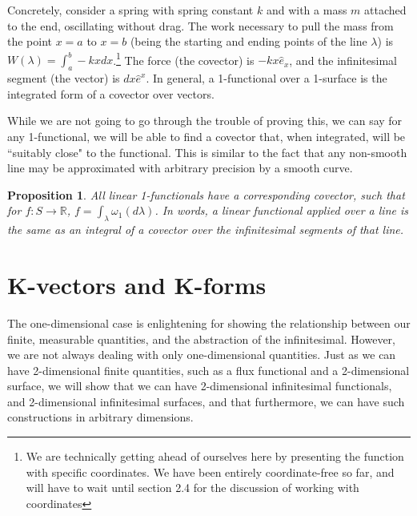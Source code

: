 \documentclass{book}
\newtheorem{prop}[equation]{Proposition}
\begin{document}
Concretely, consider a spring with spring constant $k$ and with a mass $m$ attached to the end, oscillating without drag. The work necessary to pull the mass from the point $x = a$ to $x = b$ (being the starting and ending points of the line $\lambda$) is $W(\lambda) = \int_a^b -kx dx$.\footnote{We are technically getting ahead of ourselves here by presenting the function with specific coordinates. We have been entirely coordinate-free so far, and will have to wait until section 2.4 for the discussion of working with coordinates} The force (the covector) is $-kx \hat{e}_x$, and the infinitesimal segment (the vector) is $dx \hat{e}^x$. In general, a 1-functional over a 1-surface is the integrated form of a covector over vectors. 










\begin{center}
\end{center}

While we are not going to go through the trouble of proving this, we can say for any 1-functional, we will be able to find a covector that, when integrated, will be ``suitably close" to the functional. This is similar to the fact that any non-smooth line may be approximated with arbitrary precision by a smooth curve. 

\begin{prop}
	All linear 1-functionals have a corresponding covector, such that for $f : S \to \mathbb{R}$, $f = \int_{\lambda} \omega_1(d\lambda)$. In words, a linear functional applied over a line is the same as an integral of a covector over the infinitesimal segments of that line. 
\end{prop}




\section{K-vectors and K-forms}



The one-dimensional case is enlightening for showing the relationship between our finite, measurable quantities, and the abstraction of the infinitesimal. However, we are not always dealing with only one-dimensional quantities. Just as we can have 2-dimensional finite quantities, such as a flux functional and a 2-dimensional surface, we will show that we can have 2-dimensional infinitesimal functionals, and 2-dimensional infinitesimal surfaces, and that furthermore, we can have such constructions in arbitrary dimensions. 
\end{document}
